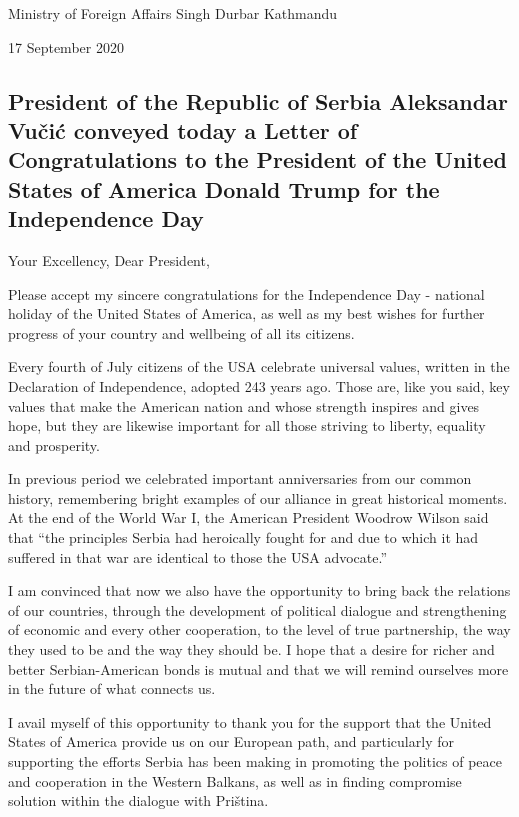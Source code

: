 \documentclass[
  openany]{book}
\begin{document}
Ministry of Foreign Affairs
Singh Durbar
Kathmandu

17 September 2020

\hypertarget{president-of-the-republic-of-serbia-aleksandar-vuux10diux107-conveyed-today-a-letter-of-congratulations-to-the-president-of-the-united-states-of-america-donald-trump-for-the-independence-day}{%
\subsection{President of the Republic of Serbia Aleksandar Vučić conveyed today a Letter of Congratulations to the President of the United States of America Donald Trump for the Independence Day}\label{president-of-the-republic-of-serbia-aleksandar-vuux10diux107-conveyed-today-a-letter-of-congratulations-to-the-president-of-the-united-states-of-america-donald-trump-for-the-independence-day}}

Your Excellency, Dear President,

Please accept my sincere congratulations for the Independence Day - national holiday of the United States of America, as well as my best wishes for further progress of your country and wellbeing of all its citizens.

Every fourth of July citizens of the USA celebrate universal values, written in the Declaration of Independence, adopted 243 years ago. Those are, like you said, key values that make the American nation and whose strength inspires and gives hope, but they are likewise important for all those striving to liberty, equality and prosperity.

In previous period we celebrated important anniversaries from our common history, remembering bright examples of our alliance in great historical moments. At the end of the World War I, the American President Woodrow Wilson said that ``the principles Serbia had heroically fought for and due to which it had suffered in that war are identical to those the USA advocate.''

I am convinced that now we also have the opportunity to bring back the relations of our countries, through the development of political dialogue and strengthening of economic and every other cooperation, to the level of true partnership, the way they used to be and the way they should be. I hope that a desire for richer and better Serbian-American bonds is mutual and that we will remind ourselves more in the future of what connects us.

I avail myself of this opportunity to thank you for the support that the United States of America provide us on our European path, and particularly for supporting the efforts Serbia has been making in promoting the politics of peace and cooperation in the Western Balkans, as well as in finding compromise solution within the dialogue with Priština.
\end{document}
